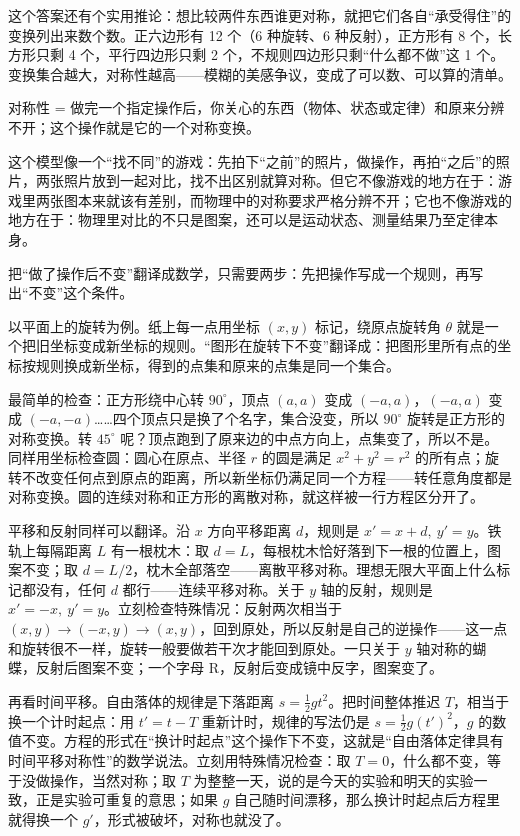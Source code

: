 这个答案还有个实用推论：想比较两件东西谁更对称，就把它们各自“承受得住”的变换列出来数个数。正六边形有 12 个（6 种旋转、6 种反射），正方形有 8 个，长方形只剩 4 个，平行四边形只剩 2 个，不规则四边形只剩“什么都不做”这 1 个。变换集合越大，对称性越高——模糊的美感争议，变成了可以数、可以算的清单。


\begin{oneline}
对称性 = 做完一个指定操作后，你关心的东西（物体、状态或定律）和原来分辨不开；这个操作就是它的一个对称变换。
\end{oneline}

这个模型像一个“找不同”的游戏：先拍下“之前”的照片，做操作，再拍“之后”的照片，两张照片放到一起对比，找不出区别就算对称。但它不像游戏的地方在于：游戏里两张图本来就该有差别，而物理中的对称要求严格分辨不开；它也不像游戏的地方在于：物理里对比的不只是图案，还可以是运动状态、测量结果乃至定律本身。


把“做了操作后不变”翻译成数学，只需要两步：先把操作写成一个规则，再写出“不变”这个条件。

以平面上的旋转为例。纸上每一点用坐标 \((x,y)\) 标记，绕原点旋转角 \(\theta\) 就是一个把旧坐标变成新坐标的规则。“图形在旋转下不变”翻译成：把图形里所有点的坐标按规则换成新坐标，得到的点集和原来的点集是同一个集合。

最简单的检查：正方形绕中心转 \(90^\circ\)，顶点 \((a,a)\) 变成 \((-a,a)\)，\((-a,a)\) 变成 \((-a,-a)\)……四个顶点只是换了个名字，集合没变，所以 \(90^\circ\) 旋转是正方形的对称变换。转 \(45^\circ\) 呢？顶点跑到了原来边的中点方向上，点集变了，所以不是。同样用坐标检查圆：圆心在原点、半径 \(r\) 的圆是满足 \(x^2+y^2=r^2\) 的所有点；旋转不改变任何点到原点的距离，所以新坐标仍满足同一个方程——转任意角度都是对称变换。圆的连续对称和正方形的离散对称，就这样被一行方程区分开了。

平移和反射同样可以翻译。沿 \(x\) 方向平移距离 \(d\)，规则是 \(x'=x+d,\ y'=y\)。铁轨上每隔距离 \(L\) 有一根枕木：取 \(d=L\)，每根枕木恰好落到下一根的位置上，图案不变；取 \(d=L/2\)，枕木全部落空——离散平移对称。理想无限大平面上什么标记都没有，任何 \(d\) 都行——连续平移对称。关于 \(y\) 轴的反射，规则是 \(x'=-x,\ y'=y\)。立刻检查特殊情况：反射两次相当于 \((x,y)\to(-x,y)\to(x,y)\)，回到原处，所以反射是自己的逆操作——这一点和旋转很不一样，旋转一般要做若干次才能回到原处。一只关于 \(y\) 轴对称的蝴蝶，反射后图案不变；一个字母 R，反射后变成镜中反字，图案变了。

再看时间平移。自由落体的规律是下落距离 \(s=\frac{1}{2}gt^2\)。把时间整体推迟 \(T\)，相当于换一个计时起点：用 \(t'=t-T\) 重新计时，规律的写法仍是 \(s=\frac{1}{2}g(t')^2\)，\(g\) 的数值不变。方程的形式在“换计时起点”这个操作下不变，这就是“自由落体定律具有时间平移对称性”的数学说法。立刻用特殊情况检查：取 \(T=0\)，什么都不变，等于没做操作，当然对称；取 \(T\) 为整整一天，说的是今天的实验和明天的实验一致，正是实验可重复的意思；如果 \(g\) 自己随时间漂移，那么换计时起点后方程里就得换一个 \(g'\)，形式被破坏，对称也就没了。

